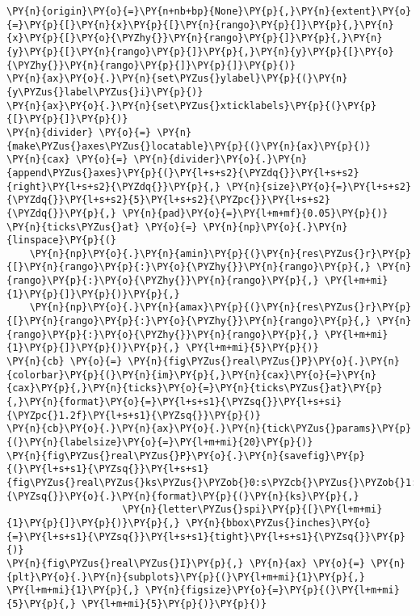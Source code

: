 \begin{Verbatim}[commandchars=\\\{\}]
        \PY{n}{origin}\PY{o}{=}\PY{n+nb+bp}{None}\PY{p}{,}\PY{n}{extent}\PY{o}{=}\PY{p}{[}\PY{n}{x}\PY{p}{[}\PY{n}{rango}\PY{p}{]}\PY{p}{,}\PY{n}{x}\PY{p}{[}\PY{o}{\PYZhy{}}\PY{n}{rango}\PY{p}{]}\PY{p}{,}\PY{n}{y}\PY{p}{[}\PY{n}{rango}\PY{p}{]}\PY{p}{,}\PY{n}{y}\PY{p}{[}\PY{o}{\PYZhy{}}\PY{n}{rango}\PY{p}{]}\PY{p}{]}\PY{p}{)}
\PY{n}{ax}\PY{o}{.}\PY{n}{set\PYZus{}ylabel}\PY{p}{(}\PY{n}{y\PYZus{}label\PYZus{}i}\PY{p}{)}
\PY{n}{ax}\PY{o}{.}\PY{n}{set\PYZus{}xticklabels}\PY{p}{(}\PY{p}{[}\PY{p}{]}\PY{p}{)}
\PY{n}{divider} \PY{o}{=} \PY{n}{make\PYZus{}axes\PYZus{}locatable}\PY{p}{(}\PY{n}{ax}\PY{p}{)}
\PY{n}{cax} \PY{o}{=} \PY{n}{divider}\PY{o}{.}\PY{n}{append\PYZus{}axes}\PY{p}{(}\PY{l+s+s2}{\PYZdq{}}\PY{l+s+s2}{right}\PY{l+s+s2}{\PYZdq{}}\PY{p}{,} \PY{n}{size}\PY{o}{=}\PY{l+s+s2}{\PYZdq{}}\PY{l+s+s2}{5}\PY{l+s+s2}{\PYZpc{}}\PY{l+s+s2}{\PYZdq{}}\PY{p}{,} \PY{n}{pad}\PY{o}{=}\PY{l+m+mf}{0.05}\PY{p}{)}
\PY{n}{ticks\PYZus{}at} \PY{o}{=} \PY{n}{np}\PY{o}{.}\PY{n}{linspace}\PY{p}{(}
    \PY{n}{np}\PY{o}{.}\PY{n}{amin}\PY{p}{(}\PY{n}{res\PYZus{}r}\PY{p}{[}\PY{n}{rango}\PY{p}{:}\PY{o}{\PYZhy{}}\PY{n}{rango}\PY{p}{,} \PY{n}{rango}\PY{p}{:}\PY{o}{\PYZhy{}}\PY{n}{rango}\PY{p}{,} \PY{l+m+mi}{1}\PY{p}{]}\PY{p}{)}\PY{p}{,}
    \PY{n}{np}\PY{o}{.}\PY{n}{amax}\PY{p}{(}\PY{n}{res\PYZus{}r}\PY{p}{[}\PY{n}{rango}\PY{p}{:}\PY{o}{\PYZhy{}}\PY{n}{rango}\PY{p}{,} \PY{n}{rango}\PY{p}{:}\PY{o}{\PYZhy{}}\PY{n}{rango}\PY{p}{,} \PY{l+m+mi}{1}\PY{p}{]}\PY{p}{)}\PY{p}{,} \PY{l+m+mi}{5}\PY{p}{)}
\PY{n}{cb} \PY{o}{=} \PY{n}{fig\PYZus{}real\PYZus{}P}\PY{o}{.}\PY{n}{colorbar}\PY{p}{(}\PY{n}{im}\PY{p}{,}\PY{n}{cax}\PY{o}{=}\PY{n}{cax}\PY{p}{,}\PY{n}{ticks}\PY{o}{=}\PY{n}{ticks\PYZus{}at}\PY{p}{,}\PY{n}{format}\PY{o}{=}\PY{l+s+s1}{\PYZsq{}}\PY{l+s+si}{\PYZpc{}1.2f}\PY{l+s+s1}{\PYZsq{}}\PY{p}{)}
\PY{n}{cb}\PY{o}{.}\PY{n}{ax}\PY{o}{.}\PY{n}{tick\PYZus{}params}\PY{p}{(}\PY{n}{labelsize}\PY{o}{=}\PY{l+m+mi}{20}\PY{p}{)}
\PY{n}{fig\PYZus{}real\PYZus{}P}\PY{o}{.}\PY{n}{savefig}\PY{p}{(}\PY{l+s+s1}{\PYZsq{}}\PY{l+s+s1}{fig\PYZus{}real\PYZus{}ks\PYZus{}\PYZob{}0:s\PYZcb{}\PYZus{}\PYZob{}1:s\PYZcb{}}\PY{l+s+s1}{\PYZsq{}}\PY{o}{.}\PY{n}{format}\PY{p}{(}\PY{n}{ks}\PY{p}{,}
                    \PY{n}{letter\PYZus{}spi}\PY{p}{[}\PY{l+m+mi}{1}\PY{p}{]}\PY{p}{)}\PY{p}{,} \PY{n}{bbox\PYZus{}inches}\PY{o}{=}\PY{l+s+s1}{\PYZsq{}}\PY{l+s+s1}{tight}\PY{l+s+s1}{\PYZsq{}}\PY{p}{)}
\PY{n}{fig\PYZus{}real\PYZus{}I}\PY{p}{,} \PY{n}{ax} \PY{o}{=} \PY{n}{plt}\PY{o}{.}\PY{n}{subplots}\PY{p}{(}\PY{l+m+mi}{1}\PY{p}{,} \PY{l+m+mi}{1}\PY{p}{,} \PY{n}{figsize}\PY{o}{=}\PY{p}{(}\PY{l+m+mi}{5}\PY{p}{,} \PY{l+m+mi}{5}\PY{p}{)}\PY{p}{)}

\end{Verbatim}
